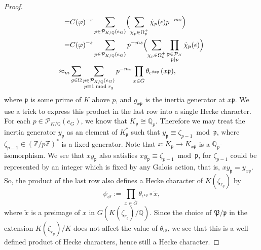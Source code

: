 \documentclass{amsart}
\numberwithin{equation}{section}
\theoremstyle{plain}
\theoremstyle{definition}
\theoremstyle{remark}
\begin{document}
\begin{proof}
\begin{equation*}
\begin{aligned}
			=&C(\varphi)^{-s}
            \sum_{p\in\mathcal{P}_{K/\mathbb{Q}}(e_G)}
            \Bigl(\sum_{\chi_p\in\Omega_p^+}\dot{\chi}_p(\epsilon)p^{-ms}\Bigr)
			\\
            =&C(\varphi)^{-s}
            \sum_{p\in\mathcal{P}_{K/\mathbb{Q}}(e_G)}p^{-ms}
            \Bigl(
            \sum_{\chi_p\in\Omega_p^+}
            \prod_{
                \substack{
                    \mathfrak{p}\in\mathcal{P}_K\\
                    \mathfrak{p}\mid p
                }
            }
            \dot{\chi}_{\mathfrak{p}}(\epsilon)
            \Bigr)
            \\
            \approx_m&
            \sum_{g\in\Omega}
            \sum_{
                \substack{
                    p\in\mathcal{P}_{K/\mathbb{Q}}(e_G)\\
                    p\equiv1\bmod{r_g}
                }
            }p^{-ms}
            \prod_{x\in\bar{G}}\theta_{\epsilon^{g_{x\mathfrak{p}}}}(x\mathfrak{p}),
        \end{aligned}
    \end{equation*}
    where $\mathfrak{p}$ is some prime of $K$ above $p$, and $g_{x\mathfrak{p}}$ is the inertia generator at $x\mathfrak{p}$.
    We use a trick to express this product in the last row into a single Hecke character.
    For each $p\in\mathcal{P}_{K/\mathbb{Q}}(e_G)$, we know that $K_{\mathfrak{p}}\cong\mathbb{Q}_p$.
    Therefore we may treat the inertia generator $y_{\mathfrak{p}}$ as an element of $K_{\mathfrak{p}}^*$ such that $y_{\mathfrak{p}}\equiv\zeta_{p-1}\bmod{\mathfrak{p}}$, where $\zeta_{p-1}\in(\mathbb{Z}/p\mathbb{Z})^*$ is a fixed generator.
    Note that $x:K_{\mathfrak{p}}\to K_{x\mathfrak{p}}$ is a $\mathbb{Q}_p$-isomorphism.
    We see that $xy_{\mathfrak{p}}$ also satisfies $xy_{\mathfrak{p}}\equiv\zeta_{p-1}\bmod{\mathfrak{p}}$, for $\zeta_{p-1}$ could be represented by an integer which is fixed by any Galois action, that is, $xy_{\mathfrak{p}}=y_{x\mathfrak{p}}$.
    So, the product of the last row also defines a Hecke character of $K(\zeta_{r_g})$ by
    \begin{equation*}
        \psi_{\epsilon^g}:=\prod_{x\in\bar{G}}\theta_{\epsilon^{xg}}\circ\tilde{x},
    \end{equation*}
    where $\tilde{x}$ is a preimage of $x$ in $G(K(\zeta_{r_g})/\mathbb{Q})$.
    Since the choice of $\mathfrak{P}/\mathfrak{p}$ in the extension $K(\zeta_{r_g})/K$ does not affect the value of $\theta_{\epsilon^g}$, we see that this is a well-defined product of Hecke characters, hence still a Hecke character.

\end{proof}
\end{document}
